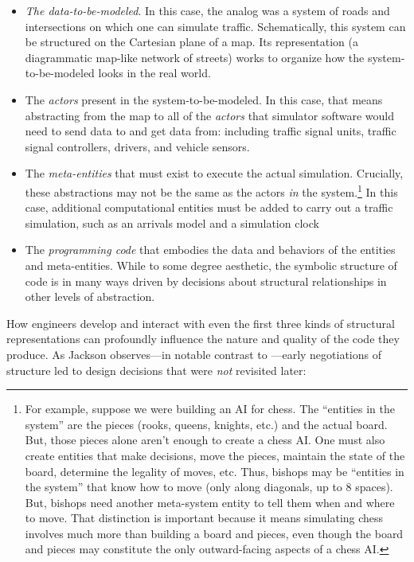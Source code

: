 \begin{itemize}
\tightlist
\item
  \emph{The data-to-be-modeled}. In this case, the analog was a system of roads and intersections on which one can simulate traffic. Schematically, this system can be structured on the Cartesian plane of a map. Its representation (a diagrammatic map-like network of streets) works to organize how the system-to-be-modeled looks in the real world.
\item
  The \emph{actors} present in the system-to-be-modeled. In this case, that means abstracting from the map to all of the \emph{actors} that simulator software would need to send data to and get data from: including traffic signal units, traffic signal controllers, drivers, and vehicle sensors.
\item
  The \emph{meta-entities} that must exist to execute the actual simulation. Crucially, these abstractions may not be the same as the actors \emph{in} the system.\footnote{For example, suppose we were building an AI for chess. The ``entities in the system'' are the pieces (rooks, queens, knights, etc.) and the actual board. But, those pieces alone aren't enough to create a chess AI. One must also create entities that make decisions, move the pieces, maintain the state of the board, determine the legality of moves, etc. Thus, bishops may be ``entities in the system'' that know how to move (only along diagonals, up to 8 spaces). But, bishops need another meta-system entity to tell them when and where to move. That distinction is important because it means simulating chess involves much more than building a board and pieces, even though the board and pieces may constitute the only outward-facing aspects of a chess AI.} In this case, additional computational entities must be added to carry out a traffic simulation, such as an arrivals model and a simulation clock \citep[ p.~559]{jackson_representing_2010}
\item
  The \emph{programming code} that embodies the data and behaviors of the entities and meta-entities. While to some degree aesthetic, the symbolic structure of code is in many ways driven by decisions about structural relationships in other levels of abstraction.
\end{itemize}

How engineers develop and interact with even the first three kinds of structural representations can profoundly influence the nature and quality of the code they produce. As Jackson \citeyearpar{jackson_representing_2010} observes---in notable contrast to \citep{baker_ideas_2010}---early negotiations of structure led to design decisions that were \emph{not} revisited later:

